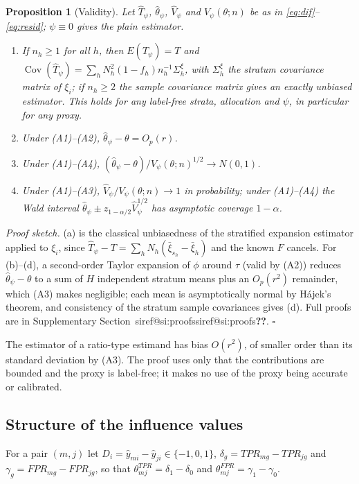 \documentclass[pdflatex,sn-mathphys-num,iicol]{sn-jnl}
\makeatletter
\theoremstyle{thmstyleone}
\newtheorem{proposition}{Proposition}
\theoremstyle{thmstyletwo}
\theoremstyle{thmstylethree}
\newcommand{\SIref}[1]{\ifcsname siref@#1\endcsname\csname siref@#1\endcsname\else\textbf{??}\fi}
\makeatother
\begin{document}
\begin{proposition}[Validity]\label{prop:validity}
Let $\hat T_\psi$, $\hat\theta_\psi$, $\hat V_\psi$ and $V_\psi(\theta;n)$ be as in \eqref{eq:dif}--\eqref{eq:resid}; $\psi\equiv0$
gives the plain estimator.
\begin{enumerate}
\item[(a)] If $n_h\ge1$ for all $h$, then $E(\hat T_\psi)=T$ and
$\operatorname{Cov}(\hat T_\psi)=\sum_hN_h^2(1-f_h)n_h^{-1}\Sigma^\xi_h$, with $\Sigma^\xi_h$ the stratum covariance matrix of
$\xi_i$; if $n_h\ge2$ the sample covariance matrix gives an exactly unbiased estimator. This holds for any label-free strata, allocation and
$\psi$, in particular for any proxy.
\item[(b)] Under (A1)--(A2), $\hat\theta_\psi-\theta=O_p(r)$.
\item[(c)] Under (A1)--(A4), $(\hat\theta_\psi-\theta)/V_\psi(\theta;n)^{1/2}\to N(0,1)$.
\item[(d)] Under (A1)--(A3), $\hat V_\psi/V_\psi(\theta;n)\to1$ in probability; under (A1)--(A4) the Wald interval
$\hat\theta_\psi\pm z_{1-\alpha/2}\hat V_\psi^{1/2}$ has asymptotic coverage $1-\alpha$.
\end{enumerate}
\end{proposition}

\emph{Proof sketch.} (a) is the classical unbiasedness of the stratified expansion estimator applied to $\xi_i$, since
$\hat T_\psi-T=\sum_hN_h(\bar\xi_{s_h}-\bar\xi_h)$ and the known $F$ cancels. For (b)--(d), a second-order Taylor expansion of $\phi$
around $\tau$ (valid by (A2)) reduces $\hat\theta_\psi-\theta$ to a sum of $H$ independent stratum means plus an $O_p(r^2)$ remainder,
which (A3) makes negligible; each mean is asymptotically normal by H\'ajek's theorem, and consistency of the stratum sample covariances gives (d).
Full proofs are in Supplementary Section~\SIref{si:proofs}. $\square$

The estimator of a ratio-type estimand has bias $O(r^2)$, of smaller order than its standard deviation by (A3). The proof
uses only that the contributions are bounded and the proxy is label-free; it makes no use of the proxy being accurate or calibrated.

\subsection{Structure of the influence values}\label{sec:theory-structure}

For a pair $(m,j)$ let $D_i=\hat y_{mi}-\hat y_{ji}\in\{-1,0,1\}$, $\delta_g=TPR_{mg}-TPR_{jg}$ and
$\gamma_g=FPR_{mg}-FPR_{jg}$, so that $\theta^{TPR}_{mj}=\delta_1-\delta_0$ and $\theta^{FPR}_{mj}=\gamma_1-\gamma_0$.
\end{document}
